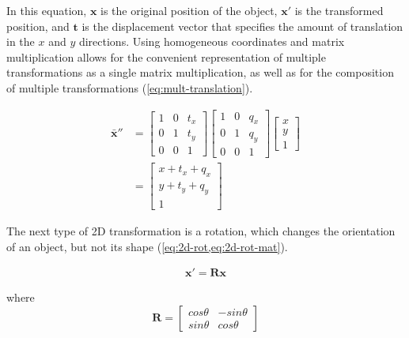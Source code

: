 In this equation, $\mathbf{x}$ is the original position of the object, $\mathbf{x'}$ is the transformed position, and $\mathbf{t}$ is the displacement vector that specifies the amount of translation in the $x$ and $y$ directions. Using homogeneous coordinates and matrix multiplication allows for the convenient representation of multiple transformations as a single matrix multiplication, as well as for the composition of multiple transformations (\cref{eq:mult-translation}). 

\begin{equation}
    \begin{aligned}
        \mathbf{\bar{x}}'' &= \begin{bmatrix}
            1 & 0 & t_x \\ 0 & 1 & t_y \\ 0 & 0 & 1
        \end{bmatrix} 
        \begin{bmatrix}
            1 & 0 & q_x \\ 0 & 1 & q_y \\ 0 & 0 & 1
        \end{bmatrix} \begin{bmatrix}
            x \\ y \\ 1 
        \end{bmatrix}\\
        &= \begin{bmatrix}
            x + t_x + q_x \\ y + t_y + q_y \\ 1
        \end{bmatrix}
    \end{aligned}
    \label{eq:mult-translation}
\end{equation}

The next type of 2D transformation is a rotation, which changes the orientation of an object, but not its shape (\cref{eq:2d-rot,eq:2d-rot-mat}). 

\begin{equation}
    \begin{aligned}
        \mathbf{x}' = \mathbf{Rx}
    \end{aligned}
    \label{eq:2d-rot}
\end{equation}

where
\begin{equation}
    \mathbf{R} = \begin{bmatrix}
        cos\theta & -sin \theta \\ sin \theta & cos \theta 
    \end{bmatrix}
    \label{eq:2d-rot-mat}
\end{equation}

